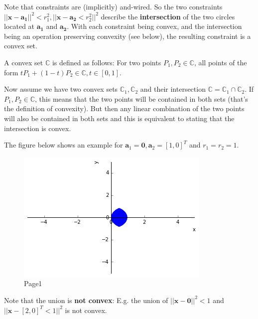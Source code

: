 Note that constraints are (implicitly) and-wired. So the two constraints \(|| \mathbf{x}-\mathbf{a_1} ||^2 < r^2_1, || \mathbf{x}-\mathbf{a_2}<r_2^2 ||^2\) describe the \textbf{intersection} of the two circles located at \(\mathbf{a_1}\) and \(\mathbf{a_2}\). With each constraint being convex, and the intersection being an operation preserving convexity (see below), the resulting constraint is a convex set.

A convex set \(\mathbb{C}\) is defined as follows: For two points \(P_1, P_2 \in \mathbb{C}\), all points of the form \(t P_1 + (1-t) P_2 \in \mathbb{C}, t \in [0,1]\).

Now assume we have two convex sets \(\mathbb{C}_1, \mathbb{C}_2\) and their intersection \(\mathbb{C} = \mathbb{C}_1 \cap \mathbb{C}_2\). If \(P_1, P_2 \in \mathbb{C}\), this means that the two points will be contained in both sets (that's the definition of convexity). But then any linear combination of the two points will also be contained in both sets and this is equivalent to stating that the intersection is convex.

The figure below shows an example for \(\mathbf{a}_1 = \mathbf{0}, \mathbf{a}_2 = [1,0]^T\) and \(r_1 = r_2 = 1\).

\begin{figure}
\centering
\includegraphics{images/optimization_01_1.png}
\caption{Page1}
\end{figure}

Note that the union is \textbf{not convex}: E.g. the union of
\(|| \mathbf{x}-\mathbf{0} ||^2 < 1\) and
\(|| \mathbf{x}- [2,0]^T < 1 ||^2\) is not convex.
